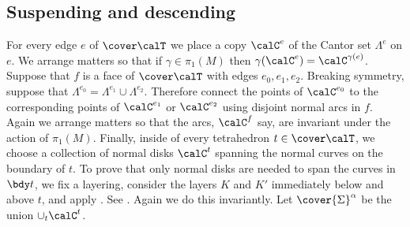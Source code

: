 \documentclass[12pt]{amsart}
\begin{document}
\subsection{Suspending and descending}
\label{Sec:SuspendingDescending}
 
For every edge $e$ of $\cover\calT$ we place a copy $\calC^e$ of the Cantor set $\Lambda^e$ on $e$. We arrange matters so that if $\gamma \in \pi_1(M)$ then $\gamma(\calC^e) = \calC^{\gamma(e)}$. Suppose that $f$ is a face of $\cover\calT$ with edges $e_0, e_1, e_2$. Breaking symmetry, suppose that $\Lambda^{e_0} = \Lambda^{e_1} \cup \Lambda^{e_2}$. Therefore connect the points of 
 $\calC^{e_0}$ to the corresponding points of $\calC^{e_1}$ or $\calC^{e_2}$ using disjoint normal arcs in $f$. Again we arrange matters so that the arcs, $\calC^f$ say, are invariant under the action of $\pi_1(M)$. Finally, inside of every tetrahedron $t \in \cover\calT$, we choose a collection of normal disks $\calC^t$ spanning the normal curves on the boundary of $t$. To prove that only normal disks are needed to span the curves in $\bdy t$, we fix a layering, consider the layers $K$ and $K'$ immediately below and above $t$, and apply . See . Again we do this invariantly.  Let $\cover{\Sigma}^\alpha$ be the union $\cup_t \calC^t$.  
 
\end{document}

